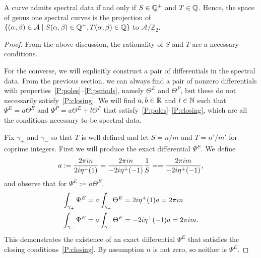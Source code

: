 \documentclass{article}
\begin{document}
\begin{lem}
\label{lem:closing_conds}
A curve admits spectral data if and only if $S\in\mathbb{Q}^+$ and $T\in\mathbb{Q}$. 
Hence, the space of genus one spectral curves is the projection of $\{(\alpha,\beta) \in \mathcal{A} \mid S(\alpha,\beta) \in \mathbb{Q}^+, T(\alpha,\beta) \in \mathbb{Q}\}$ to $\mathcal{A}/\mathbb{Z}_2$. 

\begin{proof}
From the above discussion, the rationality of $S$ and $T$ are a necessary conditions.

For the converse, we will explicitly construct a pair of differentials in the spectral data. From the previous section, we can always find a pair of nonzero differentials with properties~\ref{P:poles}--\ref{P:periods}, namely $\Theta^E$ and $\Theta^P$, but these do not necessarily satisfy~\ref{P:closing}. We will find $a,b \in \mathbb{R}$ and $l\in \mathbb{N}$ such that $\Psi^E = a\Theta^E$ and $\Psi^P = a\Theta^E + l\Theta^P$ that satisfy~\ref{P:poles}--\ref{P:closing}, which are all the conditions necessary to be spectral data.

Fix $\gamma_+$ and $\gamma_-$ so that $T$ is well-defined and let $S = n/m$ and $T = n'/m'$ for coprime integers.
First we will produce the exact differential $\Psi^E$. 
We define
\[
a := \frac{2\pi i n}{2i \eta^+(1)} = \frac{2\pi i n}{-2i \eta^+(-1)}\frac{1}{S} = = \frac{2\pi i m}{-2i \eta^+(-1)},
\]
and observe that for $\Psi^E := a\Theta^E$,
\begin{align*}
\int_{\gamma_{+}} \Psi^E &= a \int_{\gamma_+} \Theta^E = 2i \eta^+(1)a = 2\pi i n \\
\int_{\gamma_{-}} \Psi^E &= a \int_{\gamma_-} \Theta^E = -2i \eta^+(-1)a = 2\pi i m.
\end{align*}
This demonstrates the existence of an exact differential $\Psi^E$ that satisfies the closing conditions~\ref{P:closing}. By assumption $n$ is not zero, so neither is $\Psi^E$.


\end{proof}
\end{lem}
\end{document}
